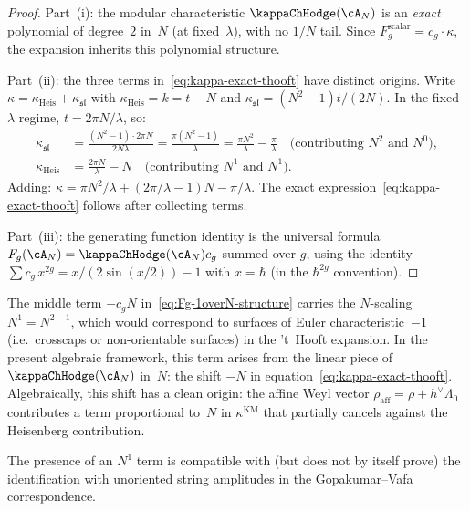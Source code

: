 \begin{proof}
Part~(i): the modular characteristic $\kappaChHodge(\cA_N)$ is an
\emph{exact} polynomial of degree~$2$ in~$N$ (at fixed~$\lambda$),
with no $1/N$ tail. Since $F_g^{\mathrm{scalar}} = c_g \cdot \kappa$,
the expansion inherits this polynomial structure.

Part~(ii): the three terms in~\eqref{eq:kappa-exact-thooft} have
distinct origins. Write $\kappa = \kappa_{\mathrm{Heis}}
+ \kappa_{\mathfrak{sl}}$ with $\kappa_{\mathrm{Heis}} = k = t - N$
and $\kappa_{\mathfrak{sl}} = (N^2-1)t/(2N)$. In the
fixed-$\lambda$ regime, $t = 2\pi N/\lambda$, so:
\begin{align*}
\kappa_{\mathfrak{sl}} &= \frac{(N^2-1) \cdot 2\pi N}{2N\lambda}
= \frac{\pi(N^2 - 1)}{\lambda}
= \frac{\pi N^2}{\lambda} - \frac{\pi}{\lambda}
\quad \text{(contributing $N^2$ and $N^0$)}, \\
\kappa_{\mathrm{Heis}} &= \frac{2\pi N}{\lambda} - N
\quad \text{(contributing $N^1$ and $N^1$)}.
\end{align*}
Adding: $\kappa = \pi N^2/\lambda + (2\pi/\lambda - 1)N
- \pi/\lambda$. The exact expression~\eqref{eq:kappa-exact-thooft}
follows after collecting terms.

Part~(iii): the generating function identity is the
universal formula
$F_g(\cA_N)=\kappaChHodge(\cA_N)c_g$ summed over $g$, using the
identity $\sum c_g\, x^{2g} = x/(2\sin(x/2)) - 1$ with $x = \hbar$
(in the $\hbar^{2g}$ convention).
\end{proof}

\begin{remark}
\label{rem:N1-euler-characteristic}
The middle term $-c_g N$ in~\eqref{eq:Fg-1overN-structure} carries
the $N$-scaling $N^1 = N^{2-1}$, which would correspond to
surfaces of Euler characteristic~$-1$ (i.e.\ crosscaps or
non-orientable surfaces) in the 't~Hooft expansion. In the
present algebraic framework, this term arises from the linear piece
of $\kappaChHodge(\cA_N)$ in~$N$: the shift $-N$ in
equation~\eqref{eq:kappa-exact-thooft}. Algebraically,
this shift has a clean origin: the affine Weyl vector
$\rho_{\mathrm{aff}} = \rho + h^\vee \Lambda_0$ contributes
a term proportional to~$N$ in $\kappa^{\mathrm{KM}}$ that partially
cancels against the Heisenberg contribution.

The presence of an $N^1$ term is compatible with (but does not by
itself prove) the identification with unoriented string amplitudes
in the Gopakumar--Vafa correspondence.
\end{remark}

